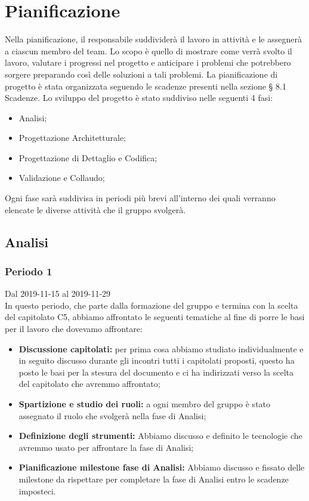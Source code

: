 \section{Pianificazione}
Nella pianificazione, il responsabile suddividerà il lavoro in attività e le assegnerà a ciascun membro del team.
Lo scopo è quello di mostrare come verrà svolto il lavoro, valutare i progressi nel progetto e anticipare i problemi che potrebbero sorgere preparando così delle soluzioni a tali problemi. 
La pianificazione di progetto è stata organizzata seguendo le scadenze presenti nella sezione § 8.1 Scadenze.
Lo sviluppo del progetto è stato suddiviso nelle seguenti 4 fasi: 
\begin{itemize}
	\item Analisi;
	\item Progettazione Architetturale;
	\item Progettazione di Dettaglio e Codifica;
	\item Validazione e Collaudo;
\end{itemize}
Ogni fase sarà suddivisa in periodi più brevi all'interno dei quali verranno elencate le diverse attività che il gruppo \Gruppo{} svolgerà.


\subsection{Analisi}

\subsubsection{Periodo 1} 
Dal 2019-11-15 al 2019-11-29\\
In questo periodo, che parte dalla formazione del gruppo e termina con la scelta del capitolato C5, abbiamo affrontato le seguenti tematiche al fine di porre le basi per il lavoro che dovevamo affrontare:\\
\begin{itemize}
	\item \textbf{Discussione capitolati:} per prima cosa abbiamo studiato individualmente e in seguito discusso durante gli incontri tutti i capitolati proposti, questo ha posto le basi per la stesura del documento \SdF{} e ci ha indirizzati verso la scelta del capitolato che avremmo affrontato;
	\item \textbf{Spartizione e studio dei ruoli:} a ogni membro del gruppo è stato assegnato il ruolo che svolgerà nella fase di Analisi;
	\item \textbf{Definizione degli strumenti:} Abbiamo discusso e definito le tecnologie che avremmo usato per affrontare la fase di Analisi;
	\item \textbf{Pianificazione milestone fase di Analisi:} Abbiamo discusso e fissato delle milestone da rispettare per completare la fase di Analisi entro le scadenze imposteci.
\end{itemize}

